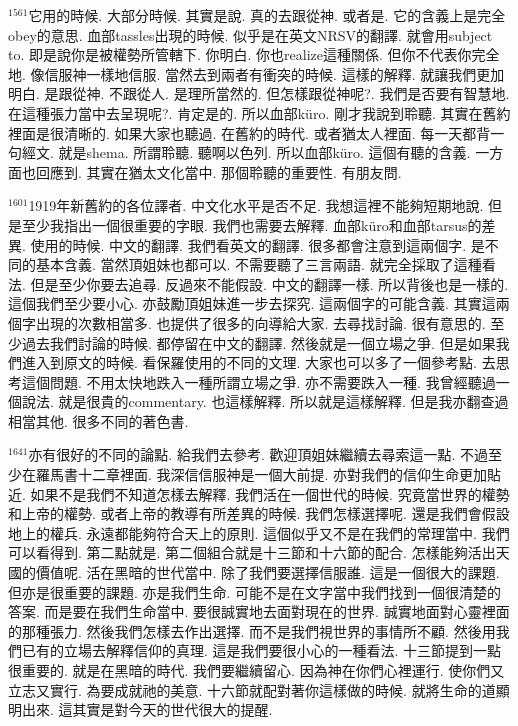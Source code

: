 \documentclass{book}
\begin{document}
$^{1561}$它用的時候.
大部分時候.
其實是說.
真的去跟從神.
或者是.
它的含義上是完全obey的意思.
血部tassles出現的時候.
似乎是在英文NRSV的翻譯.
就會用subject to.
即是說你是被權勢所管轄下.
你明白.
你也realize這種關係.
但你不代表你完全地.
像信服神一樣地信服.
當然去到兩者有衝突的時候.
這樣的解釋.
就讓我們更加明白.
是跟從神.
不跟從人.
是理所當然的.
但怎樣跟從神呢?.
我們是否要有智慧地.
在這種張力當中去呈現呢?.
肯定是的.
所以血部küro.
剛才我說到聆聽.
其實在舊約裡面是很清晰的.
如果大家也聽過.
在舊約的時代.
或者猶太人裡面.
每一天都背一句經文.
就是shema.
所謂聆聽.
聽啊以色列.
所以血部küro.
這個有聽的含義.
一方面也回應到.
其實在猶太文化當中.
那個聆聽的重要性.
有朋友問.

$^{1601}$1919年新舊約的各位譯者.
中文化水平是否不足.
我想這裡不能夠短期地說.
但是至少我指出一個很重要的字眼.
我們也需要去解釋.
血部küro和血部tarsus的差異.
使用的時候.
中文的翻譯.
我們看英文的翻譯.
很多都會注意到這兩個字.
是不同的基本含義.
當然頂姐妹也都可以.
不需要聽了三言兩語.
就完全採取了這種看法.
但是至少你要去追尋.
反過來不能假設.
中文的翻譯一樣.
所以背後也是一樣的.
這個我們至少要小心.
亦鼓勵頂姐妹進一步去探究.
這兩個字的可能含義.
其實這兩個字出現的次數相當多.
也提供了很多的向導給大家.
去尋找討論.
很有意思的.
至少過去我們討論的時候.
都停留在中文的翻譯.
然後就是一個立場之爭.
但是如果我們進入到原文的時候.
看保羅使用的不同的文理.
大家也可以多了一個參考點.
去思考這個問題.
不用太快地跌入一種所謂立場之爭.
亦不需要跌入一種.
我曾經聽過一個說法.
就是很貴的commentary.
也這樣解釋.
所以就是這樣解釋.
但是我亦翻查過相當其他.
很多不同的著色書.

$^{1641}$亦有很好的不同的論點.
給我們去參考.
歡迎頂姐妹繼續去尋索這一點.
不過至少在羅馬書十二章裡面.
我深信信服神是一個大前提.
亦對我們的信仰生命更加貼近.
如果不是我們不知道怎樣去解釋.
我們活在一個世代的時候.
究竟當世界的權勢和上帝的權勢.
或者上帝的教導有所差異的時候.
我們怎樣選擇呢.
還是我們會假設地上的權兵.
永遠都能夠符合天上的原則.
這個似乎又不是在我們的常理當中.
我們可以看得到.
第二點就是.
第二個組合就是十三節和十六節的配合.
怎樣能夠活出天國的價值呢.
活在黑暗的世代當中.
除了我們要選擇信服誰.
這是一個很大的課題.
但亦是很重要的課題.
亦是我們生命.
可能不是在文字當中我們找到一個很清楚的答案.
而是要在我們生命當中.
要很誠實地去面對現在的世界.
誠實地面對心靈裡面的那種張力.
然後我們怎樣去作出選擇.
而不是我們視世界的事情所不顧.
然後用我們已有的立場去解釋信仰的真理.
這是我們要很小心的一種看法.
十三節提到一點很重要的.
就是在黑暗的時代.
我們要繼續留心.
因為神在你們心裡運行.
使你們又立志又實行.
為要成就祂的美意.
十六節就配對著你這樣做的時候.
就將生命的道顯明出來.
這其實是對今天的世代很大的提醒.
\end{document}
